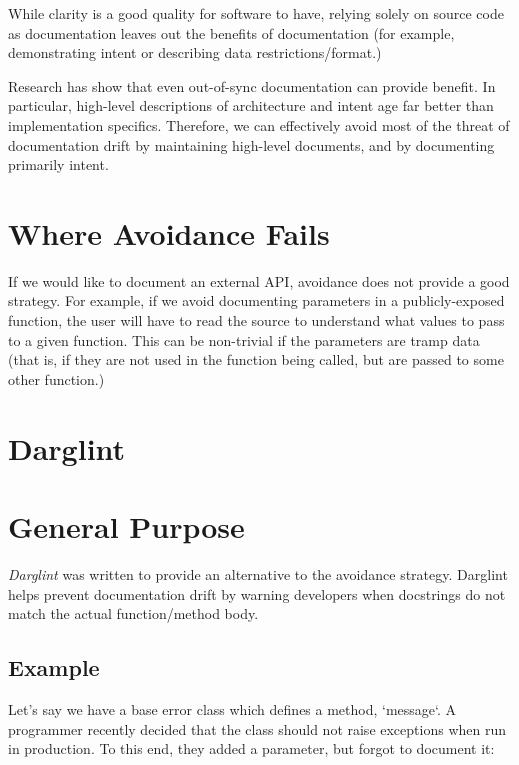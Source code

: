 \documentclass[landscape]{sciposter}
\begin{document}
\begin{multicols}{4}
        While clarity is a good quality for software to have, relying solely
        on source code as documentation leaves out the benefits of
        documentation (for example, demonstrating intent or describing data
        restrictions/format.)

        Research has show that even out-of-sync documentation can provide
        benefit.  In particular, high-level descriptions of architecture
        and intent age far better than implementation specifics.  Therefore,
        we can effectively avoid most of the threat of documentation drift
        by maintaining high-level documents, and by documenting primarily
        intent.

    \section{Where Avoidance Fails}
         If we would like to document an external API, avoidance does not
         provide a good strategy.  For example, if we avoid documenting
         parameters in a publicly-exposed function, the user will have to
         read the source to understand what values to pass to a given function.
         This can be non-trivial if the parameters are tramp data (that is,
         if they are not used in the function being called, but are passed
         to some other function.)

    \section{Darglint}

    \section{General Purpose}
        \textit{Darglint} was written to provide an alternative to the
        avoidance strategy.  Darglint helps prevent documentation drift
        by warning developers when docstrings do not match the actual
        function/method body.

        \subsection{Example}
            Let's say we have a base error class which defines a method,
            `message`.  A programmer recently decided that the class should
            not raise exceptions when run in production.  To this end,
            they added a parameter, but forgot to document it:


\end{multicols}
\end{document}
